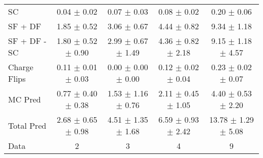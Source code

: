 \begin{tabular}{l|cccc}
                                 SC &  0.04 $\pm$  0.02 &  0.07 $\pm$  0.03 &  0.08 $\pm$  0.02 &  0.20 $\pm$  0.06 \\
                            SF + DF &  1.85 $\pm$  0.52 &  3.06 $\pm$  0.67 &  4.44 $\pm$  0.82 &  9.34 $\pm$  1.18 \\
\hline
                       SF + DF - SC &  1.80 $\pm$  0.52 $\pm$  0.90 &  2.99 $\pm$  0.67 $\pm$  1.49 &  4.36 $\pm$  0.82 $\pm$  2.18 &  9.15 $\pm$  1.18 $\pm$  4.57 \\
\hline\hline
                       Charge Flips &  0.11 $\pm$  0.01 $\pm$  0.03 &  0.00 $\pm$  0.00 $\pm$  0.00 &  0.12 $\pm$  0.02 $\pm$  0.04 &  0.23 $\pm$  0.02 $\pm$  0.07 \\
\hline
                            MC Pred &  0.77 $\pm$  0.40 $\pm$  0.38 &  1.53 $\pm$  1.16 $\pm$  0.76 &  2.11 $\pm$  0.45 $\pm$  1.05 &  4.40 $\pm$  0.53 $\pm$  2.20 \\
\hline
                         Total Pred &  2.68 $\pm$  0.65 $\pm$  0.98 &  4.51 $\pm$  1.35 $\pm$  1.68 &  6.59 $\pm$  0.93 $\pm$  2.42 & 13.78 $\pm$  1.29 $\pm$  5.08 \\
\hline\hline
                               Data &     2 &     3 &     4 &     9 \\
\hline\hline
\end{tabular}

